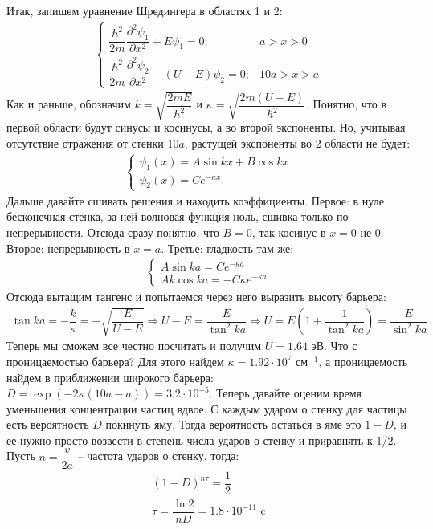 \documentclass[12pt]{article}
\begin{document}
\vspace{1em} \noindent
Итак, запишем уравнение Шредингера в областях 1 и 2:
\begin{gather*}
    \begin{cases}
         \dfrac{\hbar^2}{2m}\dfrac{\partial^2\psi_1}{\partial x^2} +  E\psi_1=0; &a>x>0  \\[10pt]
         \dfrac{\hbar^2}{2m}\dfrac{\partial^2\psi_2}{\partial x^2} - (U - E)\psi_2=0; & 10a>x>a
    \end{cases}
\end{gather*}
Как и раньше, обозначим $k = \sqrt{\dfrac{2mE}{\hbar^2}}$ и $ \kappa = \sqrt{\dfrac{2m(U -E)}{\hbar^2}}$. Понятно, что в первой области будут синусы и косинусы, а во второй экспоненты. Но, учитывая отсутствие отражения от стенки $10a$, растущей экспоненты во 2 области не будет:
\begin{gather*}
    \begin{cases}
         \psi_1(x) = A \sin{kx} + B \cos{kx}\\
         \psi_2(x) = Ce^{-\kappa x} 
    \end{cases}
\end{gather*}
Дальше давайте сшивать решения и находить коэффициенты. Первое: в нуле бесконечная стенка, за ней волновая функция ноль, сшивка только по непрерывности. Отсюда сразу понятно, что $B=0$, так косинус в $x=0$ не 0. Второе: непрерывность в $x=a$. Третье: гладкость там же:
\begin{gather*}
    \begin{cases}
         A \sin{ka} = Ce^{-\kappa a} \\
         Ak \cos{ka} = -C\kappa e^{-\kappa a}
    \end{cases}
\end{gather*}
Отсюда вытащим тангенс и попытаемся через него выразить высоту барьера:
\begin{gather*}
    \tan{ka} = -\dfrac{k}{\kappa}= - \sqrt{\dfrac{E}{U-E}} \Rightarrow U-E = \dfrac{E}{\tan^2{ka}} \Rightarrow U = E(1 + \dfrac{1}{\tan^2{ka}}) = \dfrac{E}{\sin^2{ka}}
\end{gather*}
Теперь мы сможем все честно посчитать и получим $U = 1.64$ эВ. Что с проницаемостью барьера? Для этого найдем $\kappa =1.92\cdot 10^7 \text{ см}^{-1}$, а проницаемость найдем в приближении широкого барьера: $D = \exp{\left( -2\kappa(10a-a)\right)} = 3.2\cdot10^{-5}$.
Теперь давайте оценим время уменьшения концентрации частиц вдвое. С каждым ударом о стенку для частицы есть вероятность $D$ покинуть яму. Тогда вероятность остаться в яме это $1-D$, и ее нужно просто возвести в степень числа ударов о стенку и приравнять к $1/2$. Пусть $n=\dfrac{v}{2a}$ -- частота ударов о стенку, тогда:
\begin{gather*}
    (1-D)^{n\tau} = \dfrac{1}{2}\\
    \tau = \dfrac{\ln{2}}{nD} = 1.8\cdot 10^{-11} \text{ c}
\end{gather*}
\end{document}
